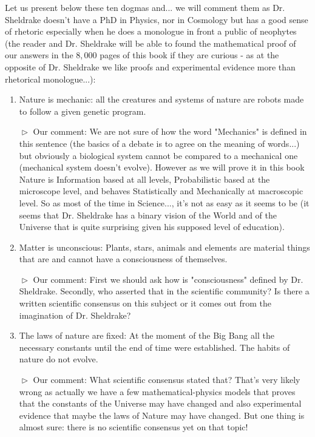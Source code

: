 	Let us present below these ten dogmas and... we will comment them as Dr. Sheldrake doesn't have a PhD in Physics, nor in Cosmology but has a good sense of rhetoric especially when he does a monologue in front a public of neophytes (the reader and Dr. Sheldrake will be able to found the mathematical proof of our answers in the $8,000$ pages of this book if they are curious - as at the opposite of Dr. Sheldrake we like proofs and experimental evidence more than rhetorical monologue...):
	\begin{enumerate}
		\item \og Nature is mechanic: all the creatures and systems of nature are robots made to follow a given genetic program. \fg{}
		
		$\vartriangleright$ Our comment: We are not sure of how the word "Mechanics" is defined in this sentence (the basics of a debate is to agree on the meaning of words...) but obviously a biological system cannot be compared to a mechanical one (mechanical system doesn't evolve). However as we will prove it in this book Nature is Information based at all levels, Probabilistic based at the microscope level, and behaves Statistically and Mechanically at macroscopic level. So as most of the time in Science..., it's not as easy as it seems to be (it seems that Dr. Sheldrake has a binary vision of the World and of the Universe that is quite surprising given his supposed level of education).
		
		\item \og Matter is unconscious: Plants, stars, animals and elements are material things that are and cannot have a consciousness of themselves. \fg{}
		
		$\vartriangleright$ Our comment: First we should ask how is "consciousness" defined by Dr. Sheldrake. Secondly, who asserted that in the scientific community? Is there a written scientific consensus on this subject or it comes out from the imagination of Dr. Sheldrake?

		\item \og The laws of nature are fixed: At the moment of the Big Bang all the necessary constants until the end of time were established. The habits of nature do not evolve. \fg{}
		
		$\vartriangleright$ Our comment: What scientific consensus stated that? That's very likely wrong as actually we have a few mathematical-physics models that proves that the constants of the Universe may have changed and also experimental evidence that maybe the laws of Nature may have changed. But one thing is almost sure: there is no scientific consensus yet on that topic!


\end{enumerate}
